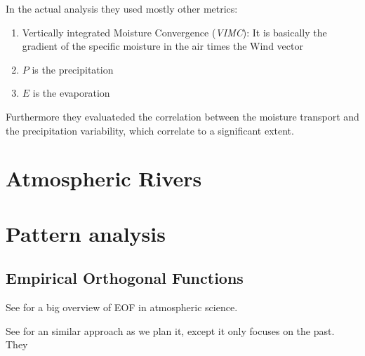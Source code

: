 In the actual analysis they used mostly other metrics:


\begin{enumerate}
  \item Vertically integrated Moisture Convergence (\textit{VIMC}): It is basically the gradient of the specific moisture in the air times the Wind vector
  \item $P$ is the precipitation 
  \item $E$ is the evaporation
\end{enumerate}

Furthermore they evaluateded the correlation between the moisture transport and the precipitation variability, which correlate to a significant extent.

\section{Atmospheric Rivers}
\label{sec:atmo-rivers}



\section{Pattern analysis}

\subsection{Empirical Orthogonal Functions}

See \cite{hannachi_empirical_2007} for a big overview of EOF in atmospheric science.

See \cite{ayantobo_integrated_2022} for an similar approach as we plan it, except it only focuses on the past.
They 
